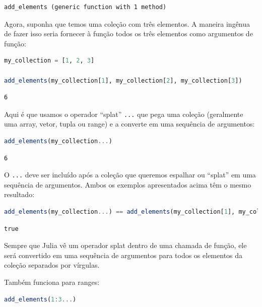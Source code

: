 \documentclass[
  notoc %
]{tufte-book}
\newcommand{\passthrough}[1]{#1}
\begin{document}
\begin{lstlisting}[language=Output]
add_elements (generic function with 1 method)
\end{lstlisting}

Agora, suponha que temos uma coleção com três elementos. A maneira
ingênua de fazer isso seria fornecer à função todos os três elementos
como argumentos de função:

\begin{lstlisting}[language=Julia]
my_collection = [1, 2, 3]

add_elements(my_collection[1], my_collection[2], my_collection[3])
\end{lstlisting}

\begin{lstlisting}[language=Output]
6
\end{lstlisting}

Aqui é que usamos o operador ``splat'' \passthrough{\lstinline!...!} que
pega uma coleção (geralmente uma array, vetor, tupla ou range) e a
converte em uma sequência de argumentos:

\begin{lstlisting}[language=Julia]
add_elements(my_collection...)
\end{lstlisting}

\begin{lstlisting}[language=Output]
6
\end{lstlisting}

O \passthrough{\lstinline!...!} deve ser incluído após a coleção que
queremos espalhar ou ``splat'' em uma sequência de argumentos. Ambos os
exemplos apresentados acima têm o mesmo resultado:

\begin{lstlisting}[language=Julia]
add_elements(my_collection...) == add_elements(my_collection[1], my_collection[2], my_collection[3])
\end{lstlisting}

\begin{lstlisting}[language=Output]
true
\end{lstlisting}

Sempre que Julia vê um operador splat dentro de uma chamada de função,
ele será convertido em uma sequência de argumentos para todos os
elementos da coleção separados por vírgulas.

Também funciona para ranges:

\begin{lstlisting}[language=Julia]
add_elements(1:3...)
\end{lstlisting}
\end{document}
